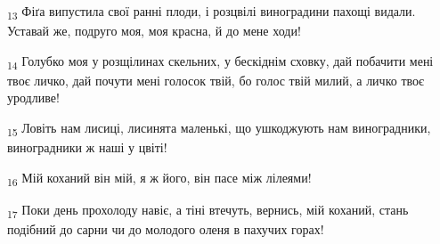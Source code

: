 \begin{tcolorbox}
\textsubscript{13} Фіґа випустила свої ранні плоди, і розцвілі виноградини пахощі видали. Уставай же, подруго моя, моя красна, й до мене ходи!
\end{tcolorbox}
\begin{tcolorbox}
\textsubscript{14} Голубко моя у розщілинах скельних, у бескіднім сховку, дай побачити мені твоє личко, дай почути мені голосок твій, бо голос твій милий, а личко твоє уродливе!
\end{tcolorbox}
\begin{tcolorbox}
\textsubscript{15} Ловіть нам лисиці, лисинята маленькі, що ушкоджують нам виноградники, виноградники ж наші у цвіті!
\end{tcolorbox}
\begin{tcolorbox}
\textsubscript{16} Мій коханий він мій, я ж його, він пасе між лілеями!
\end{tcolorbox}
\begin{tcolorbox}
\textsubscript{17} Поки день прохолоду навіє, а тіні втечуть, вернись, мій коханий, стань подібний до сарни чи до молодого оленя в пахучих горах!
\end{tcolorbox}
